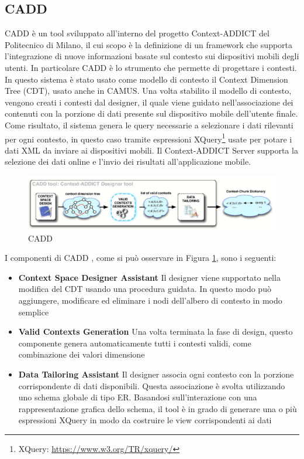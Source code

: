 \subsection*{CADD}

CADD è un tool sviluppato all'interno del progetto Context-ADDICT del Politecnico di Milano, il cui scopo è la definizione di un framework che supporta l'integrazione di nuove informazioni basate sul contesto sui dispositivi mobili degli utenti. In particolare CADD è lo strumento che permette di progettare i contesti. In questo sistema è stato usato come modello di contesto il Context Dimension Tree (CDT), usato anche in CAMUS.  Una volta stabilito il modello di contesto, vengono creati i contesti dal designer, il quale viene guidato nell'associazione dei contenuti con la porzione di dati presente sul dispositivo mobile dell'utente finale. Come risultato, il sistema genera le query necessarie a selezionare i dati rilevanti per ogni contesto, in questo caso tramite espressioni XQuery\footnote{XQuery: \url{https://www.w3.org/TR/xquery/}} usate per potare i dati XML da inviare ai dispositivi mobili.
Il Context-ADDICT Server supporta la selezione dei dati online e l'invio dei risultati all'applicazione mobile. 

\begin{figure}[ht]
	\centering
	\includegraphics[width=\textwidth]{2-nozioni-preliminari/Immagini/cadd.png}
	\caption{CADD}\label{fig:cadd}
\end{figure}
I componenti di CADD , come si può osservare in Figura  \ref{fig:cadd}, sono i seguenti:  
\begin{itemize}
	\item \textbf{Context Space Designer Assistant} Il designer viene supportato nella modifica del CDT usando una procedura guidata. In questo modo può aggiungere, modificare ed eliminare i nodi dell'albero di contesto in modo semplice
	\item \textbf{Valid Contexts Generation}
	Una volta terminata la fase di design, questo componente genera automaticamente tutti i contesti validi, come combinazione dei valori dimensione
	\item \textbf{Data Tailoring Assistant}
	Il designer associa ogni contesto con la porzione corrispondente di dati disponibili. Questa associazione è svolta utilizzando uno schema globale di tipo ER. Basandosi sull'interazione con una rappresentazione grafica dello schema, il tool è in grado di generare una o più espressioni XQuery in modo da costruire le view corrispondenti ai dati
\end{itemize}